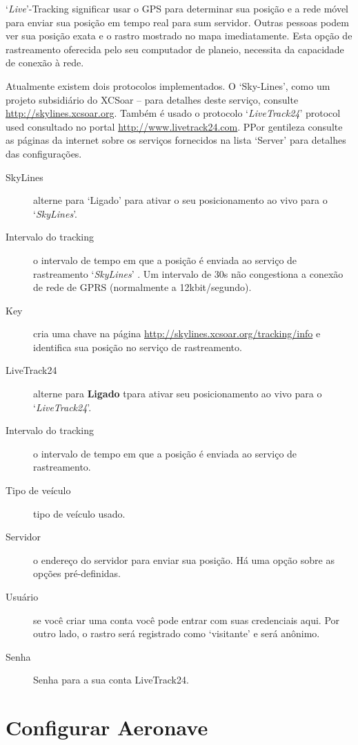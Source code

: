 `{\it Live}'-Tracking significar usar o GPS para determinar sua posição e a rede móvel para enviar sua posição em tempo real para sum servidor.  Outras pessoas podem ver sua posição exata e o rastro mostrado no mapa imediatamente.  Esta opção de rastreamento oferecida pelo seu computador de planeio, necessita da capacidade de conexão à rede.  

Atualmente existem dois protocolos implementados. O ‘Sky-Lines’, como um projeto subsidiário do XCSoar – para detalhes deste serviço, consulte
\url{http://skylines.xcsoar.org}. 
Também é usado o protocolo  `{\em LiveTrack24}' protocol used consultado no portal  \url{http://www.livetrack24.com}.  
PPor gentileza consulte as páginas da internet sobre os serviços fornecidos na lista ‘Server’ para detalhes das configurações.

\begin{description}
\item[SkyLines]  alterne para ‘Ligado’ para ativar o seu posicionamento ao vivo para o `{\em SkyLines}'.
\item[Intervalo do tracking]  o intervalo de tempo em que a posição é enviada ao serviço de rastreamento  `{\em SkyLines}' .  Um intervalo de 30s não congestiona a conexão de rede de GPRS (normalmente a 12kbit/segundo).
\item[Key]  cria uma chave na página  \url{http://skylines.xcsoar.org/tracking/info} 
   e identifica sua posição no serviço de rastreamento.
\\
\item[LiveTrack24]  alterne para  {\bf Ligado} tpara ativar seu posicionamento ao vivo para o `{\em LiveTrack24}'.
\item[Intervalo do tracking]  o intervalo de tempo em que a posição é enviada ao serviço de rastreamento.
\item[Tipo de veículo] tipo de veículo usado.
\item[Servidor]  o endereço do servidor para enviar sua posição.  Há uma opção sobre as opções pré-definidas.
\item[Usuário]  se você criar uma conta você pode entrar com suas credenciais aqui.  Por outro lado, o rastro será registrado como ‘visitante’ e será anônimo.
\item[Senha]  Senha para a sua conta LiveTrack24.
\end{description}


\section{Configurar Aeronave}

